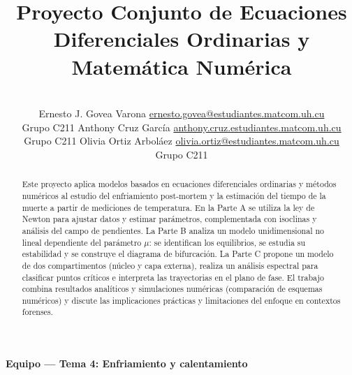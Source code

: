 \documentclass[a4paper,10pt]{article}
\title{Proyecto Conjunto de Ecuaciones Diferenciales Ordinarias y Matemática Numérica}
\author{\\
\name Ernesto J. Govea Varona \email \href{mailto:ernesto.govea@estudiantes.matcom.uh.cu}{ernesto.govea@estudiantes.matcom.uh.cu}
	\\ \addr Grupo C211 \AND
\name Anthony Cruz García \email \href{mailto:anthony.cruz.estudiantes.matcom.uh.cu}{anthony.cruz.estudiantes.matcom.uh.cu}
	\\ \addr Grupo C211 \AND
\name Olivia Ortiz Arboláez \email \href{mailto:olivia.ortiz@estudiantes.matcom.uh.cu}{olivia.ortiz@estudiantes.matcom.uh.cu}
	\\ \addr Grupo C211
}
\begin{document}
\maketitle

\vspace{-0.1cm}
\begin{center}
  {\large\bfseries Equipo --- Tema 4: Enfriamiento y calentamiento}
\end{center}
\vspace{1.0cm}


\begin{abstract}
	Este proyecto aplica modelos basados en ecuaciones diferenciales ordinarias y
	métodos numéricos al estudio del enfriamiento post‑mortem y la estimación del
	tiempo de la muerte a partir de mediciones de temperatura. En la Parte A se
	utiliza la ley de Newton para ajustar datos y estimar parámetros, complementada
	con isoclinas y análisis del campo de pendientes. La Parte B analiza un
	modelo unidimensional no lineal dependiente del parámetro $\mu$: se identifican
	los equilibrios, se estudia su estabilidad y se construye el diagrama de
	bifurcación. La Parte C propone un modelo de dos compartimentos (núcleo y
	capa externa), realiza un análisis espectral para clasificar puntos críticos
	e interpreta las trayectorias en el plano de fase. El trabajo combina
	resultados analíticos y simulaciones numéricas (comparación de esquemas
	numéricos) y discute las implicaciones prácticas y limitaciones del enfoque
	en contextos forenses.
	
\end{abstract}
\end{document}
